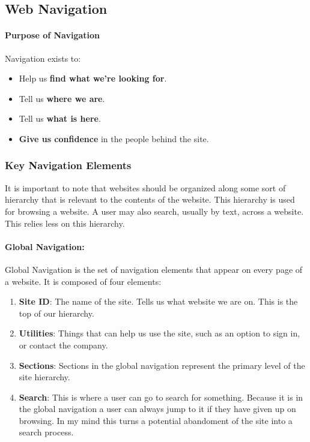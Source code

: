 \documentclass{article}%
\begin{document}
  \subsection{Web Navigation}
    \paragraph{Purpose of Navigation\\}
    Navigation exists to:
    \begin{itemize}
      \item Help us \textbf{find what we're looking for}.
      \item Tell us \textbf{where we are}.
      \item Tell us \textbf{what is here}.
      \item \textbf{Give us confidence} in the people behind the site.
    \end{itemize}
  \subsubsection{Key Navigation Elements}
    It is important to note that websites should be organized along some sort of hierarchy
    that is relevant to the contents of the website. This hierarchy is used for browsing
    a website. A user may also search, usually by text, across a website. This relies less
    on this hierarchy.
    \paragraph{Global Navigation:}
      Global Navigation is the set of navigation elements that appear on every
      page of a website. It is composed of four elements:
      \begin{enumerate}
        \item \textbf{Site ID}: The name of the site. Tells us what website we are on. This is the top of our hierarchy.
        \item \textbf{Utilities}: Things that can help us use the site, such as an option to sign in, or contact the company.
        \item \textbf{Sections}: Sections in the global navigation represent the primary level of the site hierarchy.
        \item \textbf{Search}: This is where a user can go to search for something. Because it is in the global navigation a user
                      can always jump to it if they have given up on browsing. In my mind this turns a potential
                      abandoment of the site into a search process.
      \end{enumerate}
\end{document}
